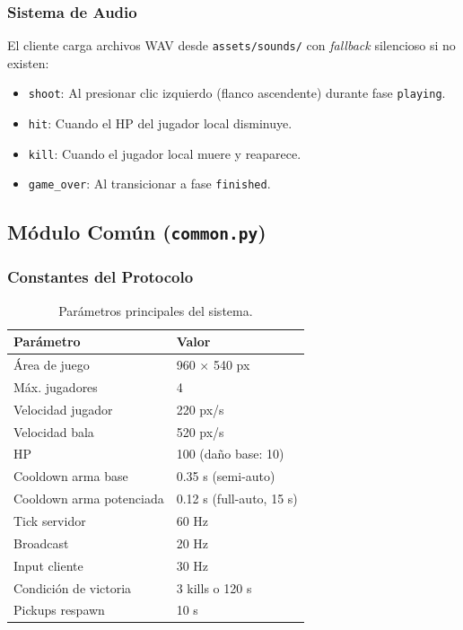 \documentclass[conference]{IEEEtran}
\begin{document}
\subsubsection{Sistema de Audio}

El cliente carga archivos WAV desde \texttt{assets/sounds/} con \textit{fallback} silencioso si no existen:
\begin{itemize}
    \item \texttt{shoot}: Al presionar clic izquierdo (flanco ascendente) durante fase \texttt{playing}.
    \item \texttt{hit}: Cuando el HP del jugador local disminuye.
    \item \texttt{kill}: Cuando el jugador local muere y reaparece.
    \item \texttt{game\_over}: Al transicionar a fase \texttt{finished}.
\end{itemize}

\subsection{M\'odulo Com\'un (\texttt{common.py})}

\subsubsection{Constantes del Protocolo}

\begin{table}[!h]
\centering
\caption{Par\'ametros principales del sistema.}
\label{tab:params}
\begin{tabular}{@{}ll@{}}
\toprule
\textbf{Par\'ametro} & \textbf{Valor} \\
\midrule
\'Area de juego & 960 $\times$ 540 px \\
M\'ax. jugadores & 4 \\
Velocidad jugador & 220 px/s \\
Velocidad bala & 520 px/s \\
HP & 100 (da\~no base: 10) \\
Cooldown arma base & 0.35 s (semi-auto) \\
Cooldown arma potenciada & 0.12 s (full-auto, 15 s) \\
Tick servidor & 60 Hz \\
Broadcast & 20 Hz \\
Input cliente & 30 Hz \\
Condici\'on de victoria & 3 kills o 120 s \\
Pickups respawn & 10 s \\
\bottomrule
\end{tabular}
\end{table}
\end{document}
